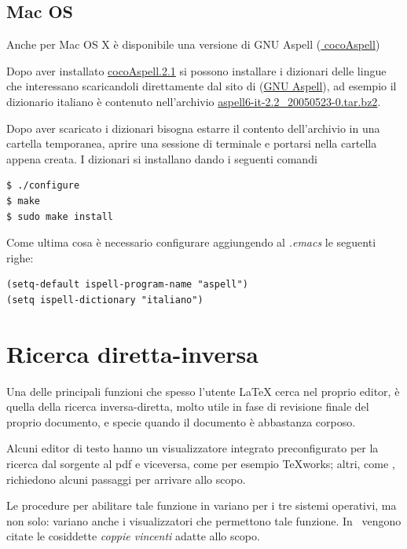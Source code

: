 \documentclass[10pt,a4paper]{article}
\begin{document}
\subsection*{Mac OS}
\label{sec:aspellmac}

Anche per Mac OS X è disponibile una versione di \textsf{GNU Aspell}
(\href{http://cocoaspell.leuski.net/}{\mano{} cocoAspell})

Dopo aver installato \href{http://people.ict.usc.edu/~leuski/%
  cocoaspell/cocoAspell.2.1.dmg}{cocoAspell.2.1} si possono installare
i dizionari delle lingue che interessano scaricandoli direttamente dal
sito di (\href{ftp://ftp.gnu.org/gnu/aspell/dict/}{\textsf{GNU
    Aspell}}), ad esempio il dizionario italiano è contenuto
nell'archivio
\href{ftp://ftp.gnu.org/gnu/aspell/dict/it/aspell6-it-2.2_20050523-0.tar.bz2}%
{aspell6-it-2.2\_20050523-0.tar.bz2}.

Dopo aver scaricato i dizionari bisogna estarre il contento
dell'archivio in una cartella temporanea, aprire una sessione di
terminale e portarsi nella cartella appena creata. I dizionari si installano
dando i seguenti comandi
\begin{verbatim}
$ ./configure
$ make
$ sudo make install
\end{verbatim}

Come ultima cosa è necessario configurare \emacs aggiungendo al \emph{.emacs}
le seguenti righe:
\begin{verbatim}
(setq-default ispell-program-name "aspell")
(setq ispell-dictionary "italiano")
\end{verbatim}

\section{Ricerca diretta-inversa}
\label{sec:ricdirinv}

Una delle  principali funzioni che spesso l'utente  \LaTeX{} cerca nel
proprio editor, è quella della ricerca inversa-diretta, molto utile in
fase di revisione finale del proprio documento, e specie quando il
documento è abbastanza corposo.

Alcuni editor di  testo hanno un visualizzatore integrato preconfigurato  
per la  ricerca dal  sorgente al  pdf e  viceversa, come  per
esempio \TeX works; altri,  come \emacs, richiedono alcuni passaggi per
arrivare allo scopo.

Le procedure  per abilitare tale funzione  in \emacs{} variano  per i tre
sistemi  operativi, ma non  solo: variano  anche i  visualizzatori che
permettono tale funzione. In~\parencite{arte:latex} vengono citate le
cosiddette \emph{coppie vincenti} adatte allo scopo.
\end{document}

